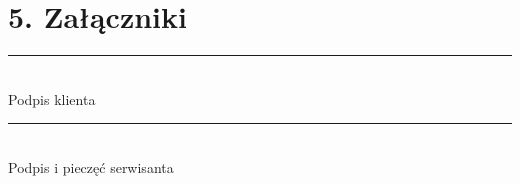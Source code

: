 \documentclass[10pt, a4paper]{article}
\begin{document}
\vspace{0.5cm}

\section*{5. Załączniki}

\vfill

\noindent
\begin{minipage}[t]{0.45\textwidth}
    \centering
    \vspace{1.2cm}
    \rule{5.5cm}{0.4pt}\\
    \vspace{0.15cm}
    \small Podpis klienta
\end{minipage}
\hfill
\begin{minipage}[t]{0.45\textwidth}
    \centering
    \vspace{1.2cm}
    \rule{5.5cm}{0.4pt}\\
    \vspace{0.15cm}
    \small Podpis i pieczęć serwisanta
\end{minipage}
\end{document}
